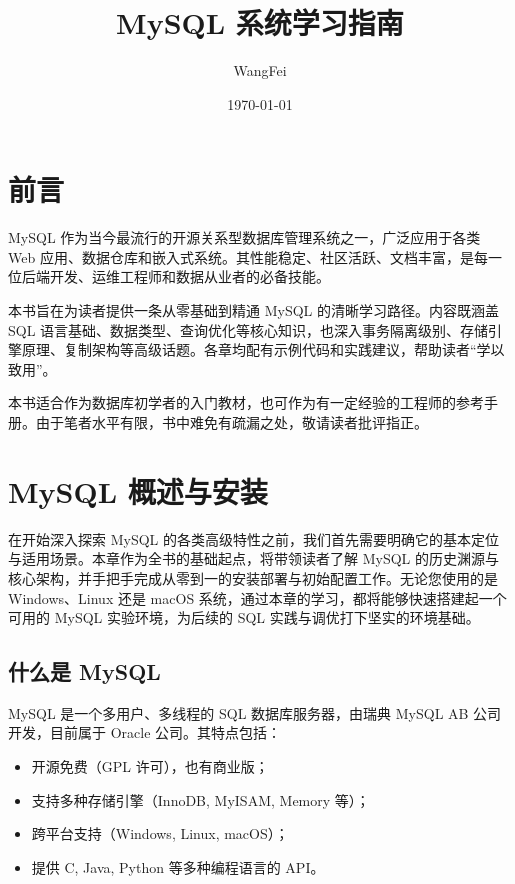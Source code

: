 \documentclass[12pt,UTF8]{ctexbook}
\title{\heiti\zihao{0} MySQL 系统学习指南}
\author{WangFei}
\date{\today}
\begin{document}
\maketitle
\tableofcontents

\frontmatter
\chapter{前言}

MySQL 作为当今最流行的开源关系型数据库管理系统之一，广泛应用于各类 Web 应用、数据仓库和嵌入式系统。其性能稳定、社区活跃、文档丰富，是每一位后端开发、运维工程师和数据从业者的必备技能。

本书旨在为读者提供一条从零基础到精通 MySQL 的清晰学习路径。内容既涵盖 SQL 语言基础、数据类型、查询优化等核心知识，也深入事务隔离级别、存储引擎原理、复制架构等高级话题。各章均配有示例代码和实践建议，帮助读者“学以致用”。

本书适合作为数据库初学者的入门教材，也可作为有一定经验的工程师的参考手册。由于笔者水平有限，书中难免有疏漏之处，敬请读者批评指正。

\mainmatter

\chapter{MySQL 概述与安装}
\label{ch:overview}

在开始深入探索 MySQL 的各类高级特性之前，我们首先需要明确它的基本定位与适用场景。本章作为全书的基础起点，将带领读者了解 MySQL 的历史渊源与核心架构，并手把手完成从零到一的安装部署与初始配置工作。无论您使用的是 Windows、Linux 还是 macOS 系统，通过本章的学习，都将能够快速搭建起一个可用的 MySQL 实验环境，为后续的 SQL 实践与调优打下坚实的环境基础。

\section{什么是 MySQL}

MySQL 是一个多用户、多线程的 SQL 数据库服务器，由瑞典 MySQL AB 公司开发，目前属于 Oracle 公司。其特点包括：

\begin{itemize}[leftmargin=2cm]
  \item 开源免费（GPL 许可），也有商业版；
  \item 支持多种存储引擎（InnoDB, MyISAM, Memory 等）；
  \item 跨平台支持（Windows, Linux, macOS）；
  \item 提供 C, Java, Python 等多种编程语言的 API。
\end{itemize}
\end{document}
